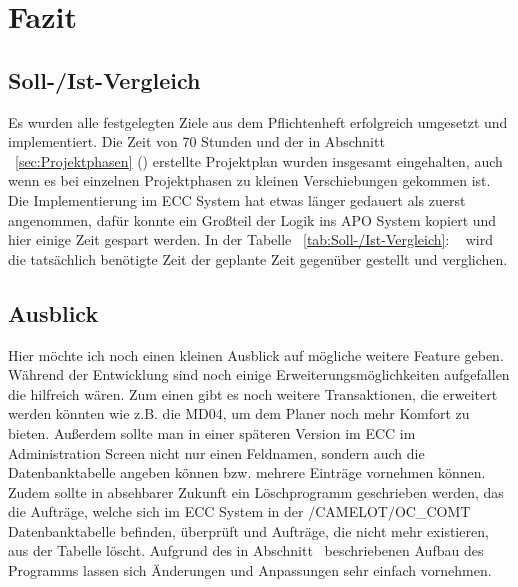 \section{Fazit} 
\label{sec:Fazit}

\subsection{Soll-/Ist-Vergleich}
\label{sec:SollIstVergleich}

Es wurden alle festgelegten Ziele aus dem Pflichtenheft erfolgreich umgesetzt und implementiert. Die Zeit von 70 Stunden und der in Abschnitt ~\ref{sec:Projektphasen} () erstellte Projektplan wurden insgesamt eingehalten, auch wenn es bei einzelnen Projektphasen zu kleinen Verschiebungen gekommen ist. Die Implementierung im \ac{ECC} System hat etwas länger gedauert als zuerst angenommen, dafür konnte ein Großteil der Logik ins \ac{APO} System kopiert und hier einige Zeit gespart werden. In der Tabelle ~\ref{tab:Soll-/Ist-Vergleich}: ~ wird die tatsächlich benötigte Zeit der geplante Zeit gegenüber gestellt und verglichen.

\subsection{Ausblick}
\label{sec:Ausblick}
Hier möchte ich noch einen kleinen Ausblick auf mögliche weitere Feature geben. Während der Entwicklung sind noch einige Erweiterungsmöglichkeiten aufgefallen die hilfreich wären. Zum einen gibt es noch weitere Transaktionen, die erweitert werden könnten wie z.B. die MD04, um dem Planer noch mehr Komfort zu bieten. Außerdem sollte man in einer späteren Version im \ac{ECC} im Administration Screen nicht nur einen Feldnamen, sondern auch die Datenbanktabelle angeben können bzw. mehrere Einträge vornehmen können. Zudem sollte in absehbarer Zukunft ein Löschprogramm geschrieben werden, das die Aufträge, welche sich im ECC System in der /CAMELOT/OC\_COMT Datenbanktabelle befinden, überprüft und Aufträge, die nicht mehr existieren, aus der Tabelle löscht. Aufgrund des in Abschnitt~ beschriebenen Aufbau des Programms lassen sich Änderungen und Anpassungen sehr einfach vornehmen. 
